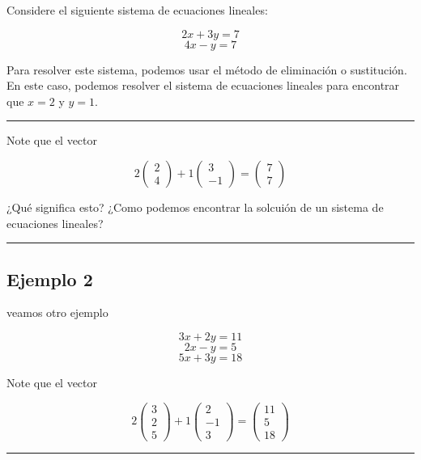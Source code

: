 \documentclass[
  letterpaper,
  DIV=11,
  numbers=noendperiod]{scrartcl}
\begin{document}
Considere el siguiente sistema de ecuaciones lineales:

\[ 2x + 3y = 7 \] \[ 4x - y = 7 \]

Para resolver este sistema, podemos usar el método de eliminación o
sustitución. En este caso, podemos resolver el sistema de ecuaciones
lineales para encontrar que \(x = 2\) y \(y = 1\).

\begin{center}\rule{0.5\linewidth}{0.5pt}\end{center}

Note que el vector

\[2\begin{pmatrix}2 \\
 4\end{pmatrix}+1\begin{pmatrix}3\\-1\end{pmatrix}=\begin{pmatrix}7\\7\end{pmatrix}\]

¿Qué significa esto? ¿Como podemos encontrar la solcuión de un sistema
de ecuaciones lineales?

\begin{center}\rule{0.5\linewidth}{0.5pt}\end{center}

\subsection{Ejemplo 2}\label{ejemplo-2}

veamos otro ejemplo

\[ 3x + 2y = 11 \] \[ 2x - y = 5 \] \[ 5x + 3y = 18 \]

Note que el vector

\[2\begin{pmatrix}3 \\ 2\\ 5
 \end{pmatrix}+1\begin{pmatrix}2\\-1\\ 3\end{pmatrix}=\begin{pmatrix}11\\5\\18\end{pmatrix}\]

\begin{center}\rule{0.5\linewidth}{0.5pt}\end{center}
\end{document}
